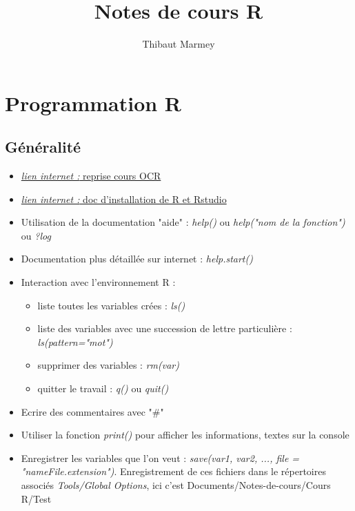 \documentclass[12pt,a4paper]{article}
\author{Thibaut Marmey}
\title{Notes de cours R}
\begin{document}
	\maketitle

\begin{normalsize}
\tableofcontents
\end{normalsize}

\section{Programmation R}
\subsection{Généralité}
\begin{itemize}
\item \href{https://openclassrooms.com/fr/courses/1393696-effectuez-vos-etudes-statistiques-avec-r/1394570-les-facteurs#/id/r-1395598}{\textit{lien internet : }reprise cours OCR}
\item \href{https://linuxconfig.org/rstudio-on-ubuntu-18-04-bionic-beaver-linux}{\textit{lien internet : }doc d'installation de R et Rstudio}
\item Utilisation de la documentation "aide" : \textit{help()} ou \textit{help("nom de la fonction")} ou  \textit{?log}
\item Documentation plus détaillée sur internet : \textit{help.start()}
\item Interaction avec l'environnement R :
\begin{itemize}
\item liste toutes les variables crées : \textit{ls()}
\item liste des variables avec une succession de lettre particulière : \textit{ls(pattern="mot")}
\item supprimer des variables : \textit{rm(var)}
\item quitter le travail : \textit{q()} ou \textit{quit()}
\end{itemize}
\item Ecrire des commentaires avec "\#"
\item Utiliser la fonction \textit{print()} pour afficher les informations, textes sur la console
\item Enregistrer les variables que l'on veut : 
\newline \textit{save(var1, var2, ..., file = "nameFile.extension")}.
\newline Enregistrement de ces fichiers dans le répertoires associés \textit{Tools/Global Options}, ici c'est Documents/Notes-de-cours/Cours R/Test
\end{itemize}
\end{document}
